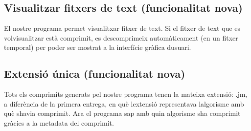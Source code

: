 \subsection*{Visualitzar fitxers de text (funcionalitat nova)}

El nostre programa permet visualitxar fitxer de text. Si el fitxer de text que es volvisualitzar està comprimit, es descomprimeix automàticament (en un fitxer temporal) per poder ser mostrat a la interfície gràfica d\textquotesingle{}usuari.

\subsection*{Extensió única (funcionalitat nova)}

Tots els comprimits generats pel nostre programa tenen la mateixa extensió\+: .jm, a diferència de la primera entrega, en què l\textquotesingle{}extensió representava l\textquotesingle{}algorisme amb què s\textquotesingle{}havia comprimit. Ara el programa sap amb quin algorisme s\textquotesingle{}ha comprimit gràcies a la metadata del comprimit. 